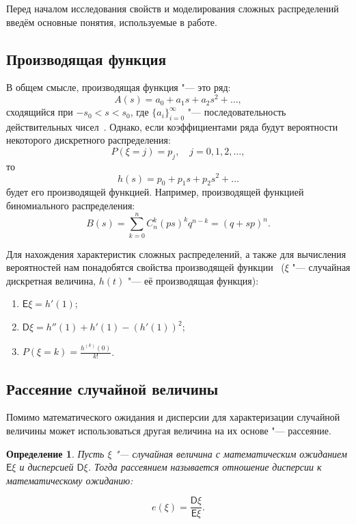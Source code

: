 \documentclass[12pt, specialist, subf, substylefile = spbu_report.rtx]{disser}
\newtheorem{define}{Определение}
\begin{document}
	Перед началом исследования свойств и моделирования сложных распределений введём основные понятия, используемые в работе.
	
	\subsection{Производящая функция}
	
	В общем смысле, производящая функция "--- это ряд:
	\[
		A(s) = a _0 + a _1 s + a _2 s ^2 + \dots,
	\]
	сходящийся при $ -s _0 < s < s _0 $, где $ \{ a _i \} ^{\infty} _{i = 0} $ "--- последовательность действительных чисел~\cite{bib:feller1952}. Однако, если коэффициентами ряда будут вероятности некоторого дискретного распределения:
	\[
		P(\xi = j) = p _j, \quad j = 0, 1, 2, \dots,
	\]
	то
	\[
		h(s) = p _0 + p _1 s + p _2 s ^2 + \dots
	\]
	будет его производящей функцией. Например, производящей функцией биномиального распределения:
	\[
		B(s) = \sum \limits ^n _{k = 0} C ^k _n (ps) ^k q ^{n - k} = (q + sp) ^n.
	\]
	
	Для нахождения характеристик сложных распределений, а также для вычисления вероятностей нам понадобятся свойства производящей функции~\cite{bib:feller1952} ($ \xi $ "--- случайная дискретная величина, $ h(t) $ "--- её производящая функция):
	
	\begin{enumerate}
		\item $ \mathsf{E} \xi = h' (1) $;
		
		\item $ \mathsf{D} \xi = h''(1) + h'(1) - \left( h' (1) \right) ^2 $;
		
		\item $ P(\xi = k) = \frac{h^{(k)}(0)} {k!} $.
	\end{enumerate}

	\subsection{Рассеяние случайной величины}
	
	Помимо математического ожидания и дисперсии для характеризации случайной величины может использоваться другая величина на их основе "--- рассеяние.
	
	\begin{define}
		Пусть $ \xi $ "--- случайная величина с математическим ожиданием $ \mathsf{E} \xi $ и дисперсией $ \mathsf{D} \xi $. Тогда рассеянием называется отношение дисперсии к математическому ожиданию:
		
		\[
			e (\xi) = \frac {\mathsf{D} \xi} {\mathsf{E} \xi}.
		\]
		\label{def:scattering}
	\end{define}
\end{document}
